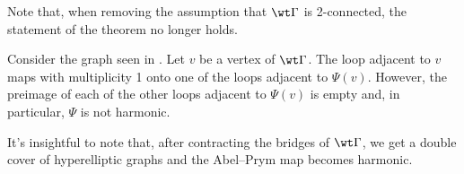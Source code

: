 Note that, when removing the assumption that $\wt\Gamma$ is 2-connected, the statement of the theorem no longer holds. 

\begin{exam}\label{ex:bridgesRuinEverything}
Consider the graph seen in . Let $v$ be a vertex of $\wt\Gamma$. The loop adjacent to $v$ maps with multiplicity 1 onto one of the loops adjacent to $\Psi(v)$. However, the preimage of each of the other loops adjacent to $\Psi(v)$ is empty and, in particular, $\Psi$ is not harmonic. 

 It's insightful to note that, after contracting the bridges of $\wt\Gamma$, we get a double cover of hyperelliptic graphs and the Abel--Prym map  becomes harmonic.

\end{exam}



